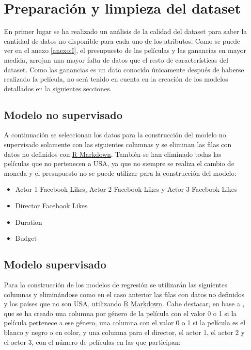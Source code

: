 \documentclass{article}
\begin{document}
\clearpage

\section{Preparación y limpieza del dataset}

En primer lugar se ha realizado un análisis de la calidad del dataset para saber la cantidad de datos no disponible para cada uno de los atributos. Como se puede ver en el anexo \ref{anexo:I}, el presupuesto de las películas y las ganancias en mayor medida, arrojan una mayor falta de datos que el resto de características del dataset. Como las ganancias es un dato conocido únicamente después de haberse realizado la película, no será tenido en cuenta en la creación de los modelos detallados en la siguientes secciones. 

\subsection{Modelo no supervisado}

A continuación se seleccionan los datos para la construcción del modelo no supervisado solamente con las siguientes columnas y se eliminan las filas con datos no definidos con \href{https://github.com/pozueco/proyecto_fin_de_master/blob/master/clean_dataset.md}{R Markdown}. También se han eliminado todas las películas que no pertenecen a USA, ya que no siempre se realiza el cambio de moneda y el presupuesto no se puede utilizar para la construcción del modelo:

\begin{itemize}
  \item Actor 1 Facebook Likes, Actor 2 Facebook Likes y Actor 3 Facebook Likes 
  \item Director Facebook Likes
  \item Duration
  \item Budget
\end{itemize}

\subsection{Modelo supervisado}

Para la construcción de los modelos de regresión se utilizarán las siguientes columnas y eliminándose como en el caso anterior las filas con datos no definidos y los países que no son USA, utilizando \href{https://github.com/pozueco/proyecto_fin_de_master/blob/master/clean_dataset.md}{R Markdown}. Cabe destacar, en base a \cite{cleansing}, que se ha creado una columna por género de la película con el valor 0 o 1 si la película pertenece a ese género, una columna con el valor 0 o 1 si la película es el blanco y negro o en color, y una columna para el director, el actor 1, el actor 2 y el actor 3, con el número de películas en las que participan:
\end{document}
